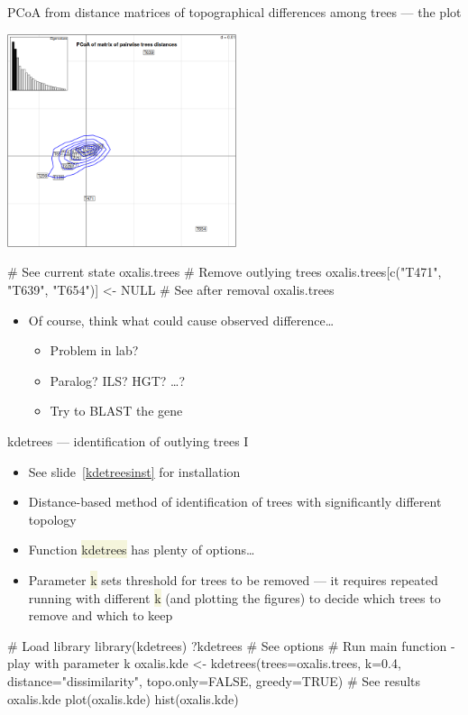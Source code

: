 \documentclass[compress, xelatex, 11pt, xcolor=svgnames, aspectratio=169,
	hyperref={
		bookmarks=true,
		unicode=true,
		colorlinks=true,
		pdftitle={Molecular data in R},
		plainpages=false,
		pdfauthor={Vojtech Zeisek},
		pdfsubject={Course about phylogeny and evolution in R},
		pdfcreator={XeLaTeX},
		pdfkeywords={R, evolution, phylogeny, molecular data},
		linkcolor=Crimson, %
		anchorcolor=Magenta, %
		citecolor=Magenta, %
		filecolor=Magenta, %
		menucolor=Magenta, %
		urlcolor=DodgerBlue, %
		},
	url={hyphens, lowtilde} %
	]{beamer}
\renewcommand{\texttt}[1]{\colorbox{Beige}{{\ttfamily #1}}}
\begin{document}
\begin{frame}[fragile]{PCoA from distance matrices of topographical differences among trees --- the plot}
	\begin{multicols}{2}
		\begin{center}
			\includegraphics[height=6.25cm]{pcoa-trees.png}
		\end{center}
		\begin{spluscode}
    # See current state
    oxalis.trees
    # Remove outlying trees
    oxalis.trees[c("T471", "T639",
      "T654")] <- NULL
    # See after removal
    oxalis.trees
		\end{spluscode}
		\begin{itemize}
			\item Of course, think what could cause observed difference\ldots
			\begin{itemize}
				\item Problem in lab?
				\item Paralog? ILS? HGT? \ldots ?
				\item Try to BLAST the gene
			\end{itemize}
		\end{itemize}
	\end{multicols}
\end{frame}

\begin{frame}[fragile]{kdetrees --- identification of outlying trees I}
	\label{kdetrees}
	\begin{itemize}
		\item See slide~\ref{kdetreesinst} for installation
		\item Distance-based method of identification of trees with significantly different topology
		\item Function \texttt{kdetrees} has plenty of options\ldots
		\item Parameter \texttt{k} sets threshold for trees to be removed --- it requires repeated running with different \texttt{k} (and plotting the figures) to decide which trees to remove and which to keep
	\end{itemize}
	\begin{spluscode}
    # Load library
    library(kdetrees)
    ?kdetrees # See options
    # Run main function - play with parameter k
    oxalis.kde <- kdetrees(trees=oxalis.trees, k=0.4,
      distance="dissimilarity", topo.only=FALSE, greedy=TRUE)
    # See results
    oxalis.kde
    plot(oxalis.kde)
    hist(oxalis.kde)
	\end{spluscode}
\end{frame}
\end{document}
